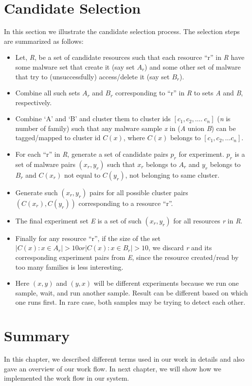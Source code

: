 \section{Candidate Selection}
\label{sec:Candidate Selection}
In this section we illustrate the candidate selection process.
The selection steps are summarized as follows:
\begin{itemize}
  \item Let, \emph{R}, be a set of candidate resources such that each resource ``r'' in \emph{R} have some malware set that create it (say set $A_r$) and some other set of malware that try to (unsuccessfully) access/delete it (say set $B_r$).
  \item Combine all such sets $A_r$ and $B_r$ corresponding to ``r'' in \emph{R} to sets \emph{A} and \emph{B}, respectively.
  \item Combine `A' and `B' and cluster them to cluster ids $[c_1,c_2,\ldots.\ c_n]$ (\emph{n} is number of family) such that any malware sample \emph{x} in (\emph{A} union \emph{B}) can be tagged/mapped to cluster id $C(x)$, where $C(x)$ belongs to $[c_1, c_2, \ldots c_n]$.
  \item For each ``r'' in \emph{R}, generate a set of candidate pairs $p_r$ for experiment. $p_r$ is a set of malware pairs $(x_r, y_r)$ such that $x_r$ belongs to $A_r$ and $y_r$ belongs to $B_r$ and $C(x_r)$ not equal to $C(y_r)$, not belonging to same cluster.
  \item Generate such $(x_r, y_r)$ pairs for all possible cluster pairs $(C(x_r), C(y_r))$ corresponding to a resource ``r''.
  \item The final experiment set \emph{E} is a set of such $(x_r, y_r)$ for all resources \emph{r} in \emph{R}.
  \item Finally for any resource ``r'', if the size of the set $| C(x) : x \in A_r | > 10 or  | C(x) : x \in B_r | > 10$, we discard \emph{r} and its corresponding experiment pairs from \emph{E}, since the resource created/read by too many families is less interesting.
  \item Here $(x,y)$ and $(y,x)$ will be different experiments because we run one sample, wait, and run another sample. Result can be different based on which one runs first. In rare case, both samples may be trying to detect each other.
\end{itemize}
\section{Summary}
\label{sec:Summary}
In this chapter, we described different terms used in our work in details and also gave an overview of our work flow.
In next chapter, we will show how we implemented the work flow in our system.

